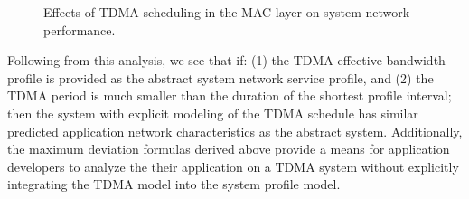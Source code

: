 \begin{figure}[ht!]
  \centering
  \caption{Effects of TDMA scheduling in the MAC layer on system
    network performance.}
  \label{fig:tdma}
\end{figure}

Following from this analysis, we see that if: (1) the TDMA effective
bandwidth profile is provided as the abstract system network service
profile, and (2) the TDMA period is much smaller than the duration of
the shortest profile interval; then the system with explicit modeling
of the TDMA schedule has similar predicted application network
characteristics as the abstract system.  Additionally, the maximum
deviation formulas derived above provide a means for application
developers to analyze the their application on a TDMA system without
explicitly integrating the TDMA model into the system profile model.

